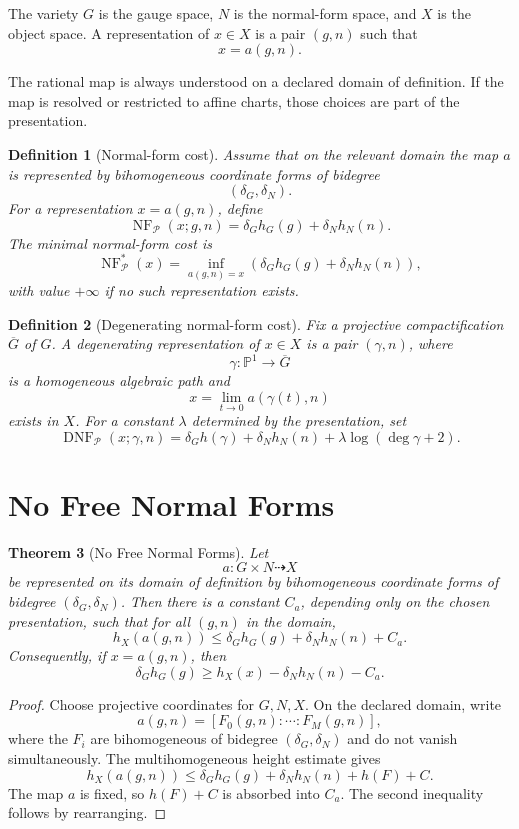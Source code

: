 \documentclass[11pt]{article}
\newtheorem{theorem}{Theorem}[section]
\newtheorem{definition}[theorem]{Definition}
\DeclareMathOperator{\DNF}{DNF}
\DeclareMathOperator{\NF}{NF}
\begin{document}
The variety \(G\) is the gauge space, \(N\) is the normal-form space, and \(X\) is the object space. A representation of \(x\in X\) is a pair \((g,n)\) such that
\[
x=a(g,n).
\]

The rational map is always understood on a declared domain of definition. If the map is resolved or restricted to affine charts, those choices are part of the presentation.

\begin{definition}[Normal-form cost]
Assume that on the relevant domain the map \(a\) is represented by bihomogeneous coordinate forms of bidegree
\[
(\delta_G,\delta_N).
\]
For a representation \(x=a(g,n)\), define
\[
\NF_{\mathcal P}(x;g,n)
=
\delta_G h_G(g)+\delta_N h_N(n).
\]
The minimal normal-form cost is
\[
\NF_{\mathcal P}^{\ast}(x)
=
\inf_{a(g,n)=x}
\left(\delta_G h_G(g)+\delta_N h_N(n)\right),
\]
with value \(+\infty\) if no such representation exists.
\end{definition}

\begin{definition}[Degenerating normal-form cost]
Fix a projective compactification \(\overline G\) of \(G\). A degenerating representation of \(x\in X\) is a pair \((\gamma,n)\), where
\[
\gamma:\mathbb P^1\to\overline G
\]
is a homogeneous algebraic path and
\[
x=\lim_{t\to0}a(\gamma(t),n)
\]
exists in \(X\). For a constant \(\lambda\) determined by the presentation, set
\[
\DNF_{\mathcal P}(x;\gamma,n)
=
\delta_G h(\gamma)+\delta_N h_N(n)
+\lambda\log(\deg\gamma+2).
\]
\end{definition}

\section{No Free Normal Forms}

\begin{theorem}[No Free Normal Forms]
Let
\[
a:G\times N\dashrightarrow X
\]
be represented on its domain of definition by bihomogeneous coordinate forms of bidegree \((\delta_G,\delta_N)\). Then there is a constant \(C_a\), depending only on the chosen presentation, such that for all \((g,n)\) in the domain,
\[
h_X(a(g,n))
\leq
\delta_G h_G(g)+\delta_N h_N(n)+C_a.
\]
Consequently, if \(x=a(g,n)\), then
\[
\delta_G h_G(g)
\geq
h_X(x)-\delta_N h_N(n)-C_a.
\]
\end{theorem}

\begin{proof}
Choose projective coordinates for \(G,N,X\). On the declared domain, write
\[
a(g,n)=[F_0(g,n):\cdots:F_M(g,n)],
\]
where the \(F_i\) are bihomogeneous of bidegree \((\delta_G,\delta_N)\) and do not vanish simultaneously. The multihomogeneous height estimate gives
\[
h_X(a(g,n))
\leq
\delta_G h_G(g)+\delta_N h_N(n)+h(F)+C.
\]
The map \(a\) is fixed, so \(h(F)+C\) is absorbed into \(C_a\). The second inequality follows by rearranging.
\end{proof}
\end{document}
